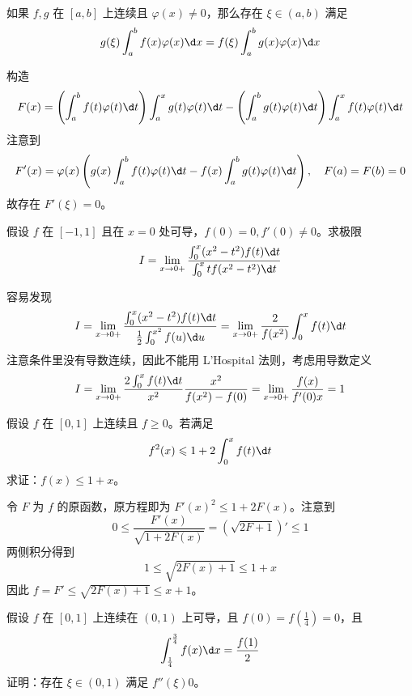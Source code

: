 \begin{problem}[000052]
如果 $f,g$ 在 $[a,b]$ 上连续且 $\varphi(x) \neq 0$，那么存在 $\xi \in (a,b)$ 满足
\[ g(\xi) \int_{a}^{b} f(x) \varphi(x) \d x = f(\xi) \int_{a}^{b} g(x) \varphi(x) \d x \]
\end{problem}

\begin{solution}
	构造
	\[ F(x) = \left(\int_{a}^{b} f(t) \varphi(t) \d t\right) \int_{a}^{x} g(t) \varphi(t) \d t - \left(\int_{a}^{b} g(t)\varphi(t) \d t \right) \int_{a}^{x} f(t) \varphi(t) \d t \]
	注意到
	\[ F'(x) =  \varphi(x)\left(g(x)\int_{a}^{b} f(t) \varphi(t) \d t - f(x) \int_{a}^{b} g(t) \varphi(t) \d t \right), \quad F(a) = F(b) = 0 \]
	故存在 $F'(\xi) = 0$。
\end{solution}

\begin{problem}[000053]
假设 $f$ 在 $[-1, 1]$ 且在 $x=0$ 处可导，$f(0) = 0, f'(0) \neq 0$。求极限
\[ I = \lim_{x \to 0+} \frac{\int_{0}^{x}(x^2 - t^2) f(t) \d t}{\int_{0}^{x} t f(x^2 - t^2) \d t} \]
\end{problem}

\begin{solution}
	容易发现
	\[ I = \lim_{x \to 0+} \frac{\int_{0}^{x} (x^2 - t^2) f(t) \d t}{\frac{1}{2} \int_{0}^{x^2} f(u) \d u} = \lim_{x \to 0+} \frac{2}{f(x^2)}\int_{0}^{x}f(t) \d t \]
	注意条件里没有导数连续，因此不能用 L'Hospital 法则，考虑用导数定义
	\[ I = \lim_{x \to 0+} \frac{2 \int_{0}^{x}f(t) \d t}{x^2} \frac{x^2}{f(x^2) - f(0)} = \lim_{x \to 0+} \frac{f(x)}{f'(0) x} = 1 \]
\end{solution}

\begin{problem}[000054]
假设 $f$ 在 $[0, 1]$ 上连续且 $f \geqslant 0$。若满足
\[ f^2(x) \leqslant 1 + 2 \int_{0}^{x} f(t) \d t \]
求证：$f(x) \leqslant 1 + x$。
\end{problem}

\begin{solution}
	令 $F$ 为 $f$ 的原函数，原方程即为 $F'(x)^2 \leqslant 1 + 2F(x)$。注意到
	\[ 0 \leqslant \frac{F'(x)}{\sqrt{1 + 2 F(x)}} = \left(\sqrt{2F+1}\right)' \leqslant 1 \]
	两侧积分得到
	\[ 1 \leqslant \sqrt{2F(x) + 1}  \leqslant 1 + x \]
	因此 $f = F' \leqslant \sqrt{2F(x) + 1} \leqslant x + 1$。
\end{solution}

\begin{problem}[000055]
假设 $f$ 在 $[0, 1]$ 上连续在 $(0, 1)$ 上可导，且 $f(0) = f(\frac{1}{4}) = 0$，且
\[ \int_{\frac{1}{4}}^{\frac{3}{4}} f(x) \d x = \frac{f(1)}{2} \]
证明：存在 $\xi \in (0, 1)$ 满足 $f''(\xi)  0$。
\end{problem}

